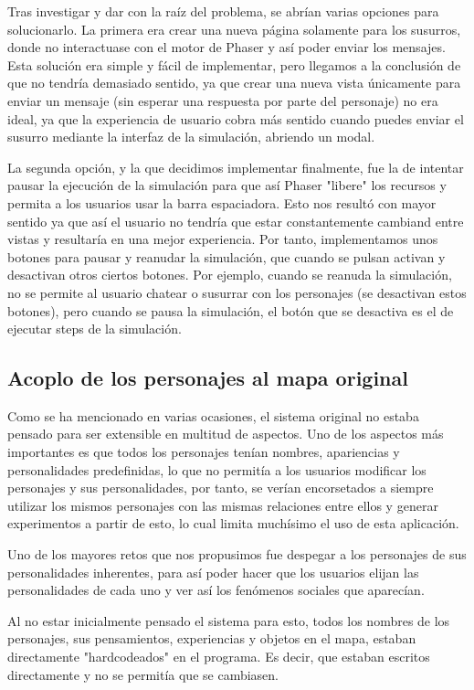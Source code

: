 Tras investigar y dar con la raíz del problema, se abrían varias opciones para solucionarlo. La primera era crear una nueva página solamente para los susurros, donde no interactuase con el motor de Phaser y así poder enviar los mensajes. Esta solución era simple y fácil de implementar, pero llegamos a la conclusión de que no tendría demasiado sentido, ya que crear una nueva vista únicamente para enviar un mensaje (sin esperar una respuesta por parte del personaje) no era ideal, ya que la experiencia de usuario cobra más sentido cuando puedes enviar el susurro mediante la interfaz de la simulación, abriendo un modal.

La segunda opción, y la que decidimos implementar finalmente, fue la de intentar pausar la ejecución de la simulación para que así Phaser "libere" los recursos y permita a los usuarios usar la barra espaciadora. Esto nos resultó con mayor sentido ya que así el usuario no tendría que estar constantemente cambiand entre vistas y resultaría en una mejor experiencia. Por tanto, implementamos unos botones para pausar y reanudar la simulación, que cuando se pulsan activan y desactivan otros ciertos botones. Por ejemplo, cuando se reanuda la simulación, no se permite al usuario chatear o susurrar con los personajes (se desactivan estos botones), pero cuando se pausa la simulación, el botón que se desactiva es el de ejecutar steps de la simulación.

\subsection{Acoplo de los personajes al mapa original}
\label{problemaPersonajes}
Como se ha mencionado en varias ocasiones, el sistema original no estaba pensado para ser extensible en multitud de aspectos. Uno de los aspectos más importantes es que todos los personajes tenían nombres, apariencias y personalidades predefinidas, lo que no permitía a los usuarios modificar los personajes y sus personalidades, por tanto, se verían encorsetados a siempre utilizar los mismos personajes con las mismas relaciones entre ellos y generar experimentos a partir de esto, lo cual limita muchísimo el uso de esta aplicación.

Uno de los mayores retos que nos propusimos fue despegar a los personajes de sus personalidades inherentes, para así poder hacer que los usuarios elijan las personalidades de cada uno y ver así los fenómenos sociales que aparecían.

Al no estar inicialmente pensado el sistema para esto, todos los nombres de los personajes, sus pensamientos, experiencias y objetos en el mapa, estaban directamente "hardcodeados" en el programa. Es decir, que estaban escritos directamente y no se permitía que se cambiasen.

